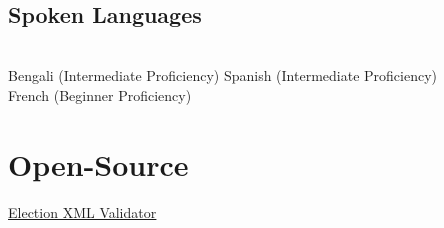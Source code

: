 \documentclass[]{deedy-resume-openfont}
\begin{document}
\begin{minipage}[t]{0.31\textwidth}
\\[1\baselineskip]

\subsection{Spoken Languages}
\\[1\baselineskip]
Bengali (Intermediate Proficiency)
Spanish (Intermediate Proficiency) \\
French (Beginner Proficiency)\\

\section{Open-Source}
\textbullet{} \color{blue}\underline{\color{blue}\href{https://github.com/google/election_results_xml_validator}{\color{blue}Election XML Validator}}

%
%

\end{minipage}
\hfill
\end{document}
